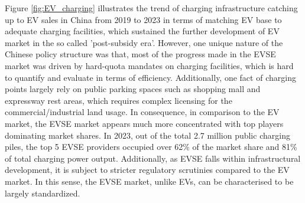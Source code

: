 \documentclass[12pt]{article}
\begin{document}
Figure \ref{fig:EV_charging} illustrates the trend of charging infrastructure catching up to EV sales in China from 2019 to 2023 in terms of matching EV base to adequate charging facilities,
which sustained the further development of EV market in the so called 'post-subsidy era'.
However, one unique nature of the Chinese policy structure was that, most of the progress made in the EVSE market was driven by hard-quota mandates on charging facilities,
which is hard to quantify and evaluate in terms of efficiency. Additionally, one fact of charging points largely rely on public parking spaces such as shopping mall and expressway rest areas,
which requires complex licensing for the commercial/industrial land usage. In consequence, in comparison to the EV market, the EVSE market appears much more concentrated with top players dominating market shares.
In 2023, out of the total 2.7 million public charging piles, the top 5 EVSE providers occupied over 62\% of the market share and 81\% of total charging power output.
Additionally, as EVSE falls within infrastructural development, it is subject to stricter regulatory scrutinies compared to the EV market.
In this sense, the EVSE market, unlike EVs, can be characterised to be largely standardized.
\end{document}
